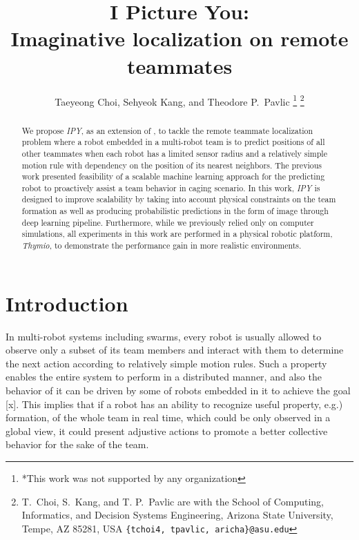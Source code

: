\documentclass[letterpaper, 10 pt, conference]{ieeeconf}  %
\title{\LARGE \bf
	I Picture You: \\
	Imaginative localization on remote teammates
}
\author{Taeyeong Choi, Sehyeok Kang, and Theodore P.~Pavlic %
	\thanks{*This work was not supported by any organization}%
	\thanks{T.~Choi, S.~Kang, and T. P.~Pavlic are with the School of Computing, Informatics, and Decision Systems Engineering,
		Arizona State University, Tempe, AZ 85281, USA
		{\tt\small \{tchoi4, tpavlic, aricha\}@asu.edu}}%
}
\begin{document}
	
	
	
	\maketitle
	\thispagestyle{empty}
	\pagestyle{empty}
	
	
	\begin{abstract}
		
		We propose \emph{IPY}, as an extension of \cite{Choi17}, to tackle the remote teammate 
		localization problem where a robot embedded in a multi-robot team is to predict positions 
		of all other teammates when each robot has a limited sensor radius and a 
		relatively simple motion rule with dependency on the position of its nearest neighbors. 
		The previous work presented feasibility of a scalable machine learning approach for the 
		predicting robot to proactively assist a team behavior in caging scenario. 
		In this work, \emph{IPY} is designed to improve scalability by taking into account
		physical constraints on the team formation as well as producing probabilistic predictions  
		in the form of image through deep learning pipeline.
		Furthermore, while we previously relied only on computer simulations, 
		all experiments in this work are performed in a physical robotic platform, \emph{Thymio}, 
		to demonstrate the performance gain in more realistic environments. 
		
	\end{abstract}
	
	
	
	\section{Introduction}
	\label{sec:intro}
	
	In multi-robot systems including swarms, every robot is usually allowed to observe 
	only a subset of its team members and interact with them to determine the next action 
	according to relatively simple motion rules. 
	Such a property enables the entire system to perform in a distributed manner, and 
	also the behavior of it can be driven by some of robots embedded in it to 
	achieve the goal [x]. 
	This implies that if a robot has an ability to recognize useful property, e.g.) formation, 
	of the whole team in real time, which could be only observed in a global view,
	it could present adjustive actions to promote a better collective behavior 
	for the sake of the team.
	
\end{document}
